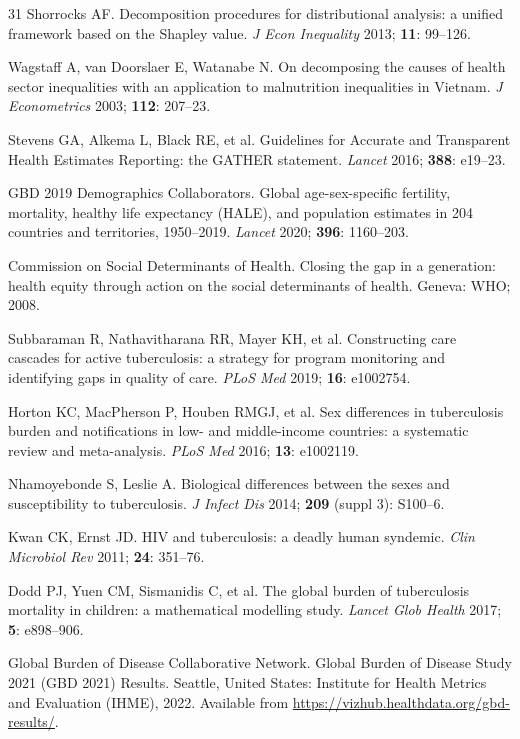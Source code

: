 \documentclass[12pt]{article}
\begin{document}
\begin{thebibliography}{31}
Shorrocks AF. Decomposition procedures for distributional analysis: a unified framework based on the Shapley value. \textit{J Econ Inequality} 2013; \textbf{11}: 99--126.

Wagstaff A, van Doorslaer E, Watanabe N. On decomposing the causes of health sector inequalities with an application to malnutrition inequalities in Vietnam. \textit{J Econometrics} 2003; \textbf{112}: 207--23.

Stevens GA, Alkema L, Black RE, et al. Guidelines for Accurate and Transparent Health Estimates Reporting: the GATHER statement. \textit{Lancet} 2016; \textbf{388}: e19--23.

GBD 2019 Demographics Collaborators. Global age-sex-specific fertility, mortality, healthy life expectancy (HALE), and population estimates in 204 countries and territories, 1950--2019. \textit{Lancet} 2020; \textbf{396}: 1160--203.

Commission on Social Determinants of Health. Closing the gap in a generation: health equity through action on the social determinants of health. Geneva: WHO; 2008.

Subbaraman R, Nathavitharana RR, Mayer KH, et al. Constructing care cascades for active tuberculosis: a strategy for program monitoring and identifying gaps in quality of care. \textit{PLoS Med} 2019; \textbf{16}: e1002754.

Horton KC, MacPherson P, Houben RMGJ, et al. Sex differences in tuberculosis burden and notifications in low- and middle-income countries: a systematic review and meta-analysis. \textit{PLoS Med} 2016; \textbf{13}: e1002119.

Nhamoyebonde S, Leslie A. Biological differences between the sexes and susceptibility to tuberculosis. \textit{J Infect Dis} 2014; \textbf{209} (suppl 3): S100--6.

Kwan CK, Ernst JD. HIV and tuberculosis: a deadly human syndemic. \textit{Clin Microbiol Rev} 2011; \textbf{24}: 351--76.

Dodd PJ, Yuen CM, Sismanidis C, et al. The global burden of tuberculosis mortality in children: a mathematical modelling study. \textit{Lancet Glob Health} 2017; \textbf{5}: e898--906.

Global Burden of Disease Collaborative Network. Global Burden of Disease Study 2021 (GBD 2021) Results. Seattle, United States: Institute for Health Metrics and Evaluation (IHME), 2022. Available from \url{https://vizhub.healthdata.org/gbd-results/}.


\end{thebibliography}
\end{document}
